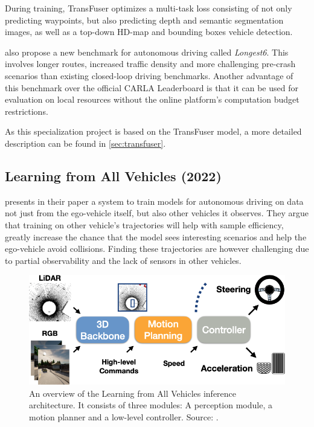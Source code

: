 During training, TransFuser optimizes a multi-task loss consisting of not only predicting waypoints,
but also predicting depth and semantic segmentation images,
as well as a top-down HD-map and bounding boxes vehicle detection.

\textcite{transfuser-pami} also propose a new benchmark for autonomous driving called \textit{Longest6}. This involves longer routes, increased traffic density and more challenging pre-crash scenarios than existing closed-loop driving benchmarks. Another advantage of this benchmark over the official CARLA Leaderboard is that it can be used for evaluation on local resources without the online platform's computation budget restrictions.

As this specialization project is based on the TransFuser model, a more detailed description can be found in  \cref{sec:transfuser}.


\subsection{Learning from All Vehicles (2022)}
\textcite{chen2022lav} presents in their paper a system to train models for autonomous driving on data not just from the ego-vehicle itself, but also other vehicles it observes.
They argue that training on other vehicle's trajectories will help with sample efficiency, greatly increase the chance that the model sees interesting scenarios and help the ego-vehicle avoid collisions. Finding these trajectories are however challenging due to partial observability and the lack of sensors in other vehicles.

\begin{figure}[htbp]
    \centering
    \includegraphics[width=.7\textwidth]{figures/2/lav.png}
    \caption{An overview of the Learning from All Vehicles inference architecture. It consists of three modules: A perception module, a motion planner and a low-level controller. Source: \cite{chen2022lav}.}
    \label{fig:lav}
\end{figure}

